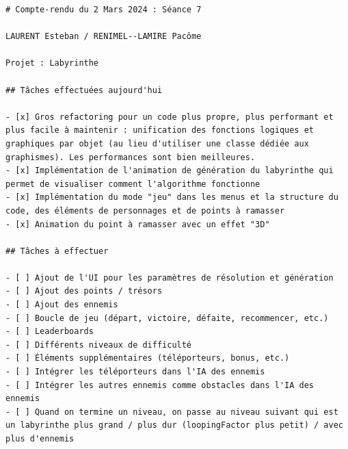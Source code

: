 \documentclass[12pt]{scrreprt} %
\begin{document}
\begin{verbatim}
# Compte-rendu du 2 Mars 2024 : Séance 7

LAURENT Esteban / RENIMEL--LAMIRE Pacôme

Projet : Labyrinthe

## Tâches effectuées aujourd'hui

- [x] Gros refactoring pour un code plus propre, plus performant et plus facile à maintenir : unification des fonctions logiques et graphiques par objet (au lieu d'utiliser une classe dédiée aux graphismes). Les performances sont bien meilleures.
- [x] Implémentation de l'animation de génération du labyrinthe qui permet de visualiser comment l'algorithme fonctionne
- [x] Implémentation du mode "jeu" dans les menus et la structure du code, des éléments de personnages et de points à ramasser
- [x] Animation du point à ramasser avec un effet "3D"

## Tâches à effectuer

- [ ] Ajout de l'UI pour les paramètres de résolution et génération
- [ ] Ajout des points / trésors
- [ ] Ajout des ennemis
- [ ] Boucle de jeu (départ, victoire, défaite, recommencer, etc.)
- [ ] Leaderboards
- [ ] Différents niveaux de difficulté
- [ ] Éléments supplémentaires (téléporteurs, bonus, etc.)
- [ ] Intégrer les téléporteurs dans l'IA des ennemis
- [ ] Intégrer les autres ennemis comme obstacles dans l'IA des ennemis
- [ ] Quand on termine un niveau, on passe au niveau suivant qui est un labyrinthe plus grand / plus dur (loopingFactor plus petit) / avec plus d'ennemis

\end{verbatim}
\end{document}
